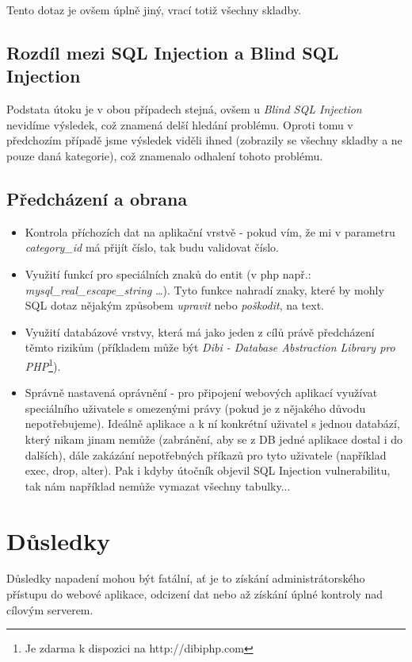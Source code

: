 \documentclass[12pt, a4paper]{report}
\begin{document}
Tento dotaz je ovšem úplně jiný, vrací totiž všechny skladby.

\section{Rozdíl mezi SQL Injection a Blind SQL Injection}
Podstata útoku je v obou případech stejná, ovšem u \textit{Blind SQL Injection} nevidíme výsledek, což znamená delší hledání problému. Oproti tomu v předchozím případě jsme výsledek viděli ihned (zobrazily se všechny skladby a ne pouze daná kategorie), což znamenalo odhalení tohoto problému. 

\section{Předcházení a obrana}
\begin{itemize}
\item Kontrola příchozích dat na aplikační vrstvě - pokud vím, že mi v parametru \textit{category\_id} má přijít číslo, tak budu validovat číslo.
\item Využití funkcí pro  speciálních znaků do entit (v php např.: \textit{mysql\_real\_escape\_string} \ldots). Tyto funkce nahradí znaky, které by mohly SQL dotaz nějakým způsobem \textit{upravit} nebo \textit{poškodit}, na text.
\item Využití databázové vrstvy, která má jako jeden z cílů právě předcházení těmto rizikům (příkladem může být \textit{Dibi - Database Abstraction Library pro PHP}\footnote{Je zdarma k dispozici na http://dibiphp.com}).
\item Správně nastavená oprávnění - pro připojení webových aplikací využívat speciálního uživatele s omezenými právy (pokud je z nějakého důvodu nepotřebujeme). Ideálně aplikace a k ní konkrétní uživatel s jednou databází, který nikam jinam nemůže (zabránění, aby se z DB jedné aplikace dostal i do dalších), dále zakázání nepotřebných příkazů pro tyto uživatele (například exec, drop, alter). Pak i kdyby útočník objevil SQL Injection vulnerabilitu, tak nám například nemůže vymazat všechny tabulky...
\end{itemize}

\chapter{Důsledky}
Důsledky napadení mohou být fatální, ať je to získání administrátorského přístupu do webové aplikace, odcizení dat nebo až získání úplné kontroly nad cílovým serverem.
\end{document}

